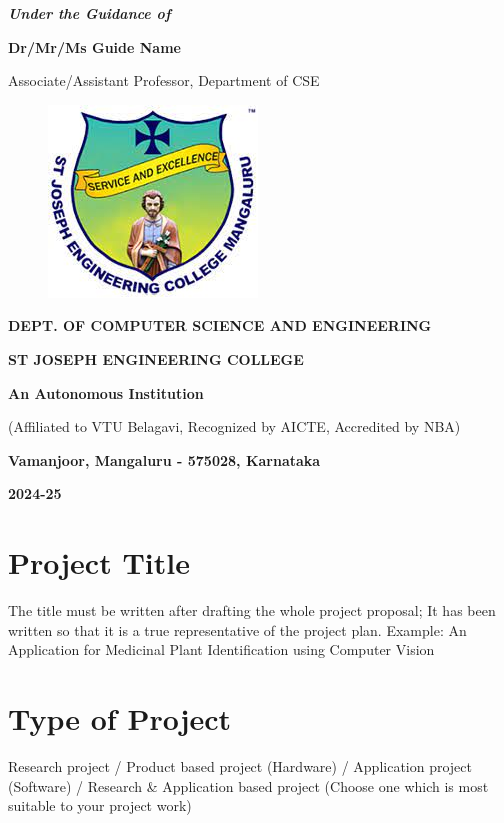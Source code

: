 \documentclass[12pt,a4paper]{report}
\begin{document}
\begin{center}
\vspace{12pt}
\textit{\textbf{Under the Guidance of}}
\par
\vspace{6pt}
\textbf{Dr/Mr/Ms Guide Name }
\par
\vspace{2pt}
\normalsize { Associate/Assistant Professor, Department of CSE }
\par
\begin{figure}[hbtp]
\centering
\includegraphics[scale=0.6]{./pic/sjeclogo}
\end{figure}
\large \textbf{DEPT. OF COMPUTER SCIENCE AND ENGINEERING}
\par \Large \textbf{ST JOSEPH ENGINEERING COLLEGE}
\par 
\textbf{An Autonomous Institution}
\par
{\large{(Affiliated to VTU Belagavi, Recognized by AICTE, Accredited by NBA)}}
\par
\vspace{3pt}
{\large \textbf{Vamanjoor, Mangaluru - 575028, Karnataka}}
\par 
\vspace{12pt}
{\Large \textbf{2024-25}}
\end{center}
\newpage

\pagestyle{plain}

\section*{Project Title}
The title must be written after drafting the whole project proposal; It has been written so that it is a true representative of the project plan. 
Example: An Application for Medicinal Plant Identification using Computer Vision

\section*{Type of Project}
Research project / Product based project (Hardware) / Application project (Software) / Research \& Application based project (Choose one which is most suitable to your project work)
\end{document}
